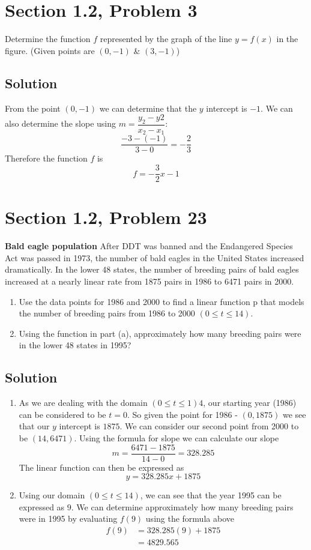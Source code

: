 \documentclass{article}
\newcommand{\problem}[2]{\vspace{5ex}\section*{Section #1, Problem #2}}
\newcommand{\solution}{\subsection*{Solution}}
\begin{document}
\problem{1.2}{3}
Determine the function $f$ represented by the graph of the line $y = f(x)$ in the figure.
(Given points are $(0, -1)$ \& $(3, -1)$)

\solution{}
From the point $(0, -1)$ we can determine that the $y$ intercept is $-1$. We can also determine the
slope using $m = \dfrac{y_2 - y2}{x_2 - x_1}$:
\[
  \frac{-3 - (-1)}{3 - 0} = -\frac{2}{3}
\]
Therefore the function $f$ is
\[
  f = -\frac{3}{2}x - 1
\]

\problem{1.2}{23}
\textbf{Bald eagle population} After DDT was banned and the Endangered Species Act was passed in
1973, the number of bald eagles in the United States increased dramatically. In the lower 48 states,
the number of breeding pairs of bald eagles increased at a nearly linear rate from 1875 pairs in
1986 to 6471 pairs in 2000.

\begin{enumerate}[label=\textbf{\alph*. }]
  \item Use the data points for 1986 and 2000 to find a linear function p that models the number of
    breeding pairs from 1986 to 2000 $(0 \leq t \leq 14)$.
  \item Using the function in part (a), approximately how many breeding pairs were in the lower 48
    states in 1995?
\end{enumerate}

\solution{}
\begin{enumerate}[label=\textbf{\alph*. }]
\item
  As we are dealing with the domain $(0 \leq t \leq 1)4$, our starting year (1986) can be considered
  to be $t = 0$. So given the point for 1986 \-- $(0, 1875)$ we see that our $y$ intercept is
  $1875$. We can consider our second point from 2000 to be $(14, 6471)$. Using the formula for slope
  we can calculate our slope
  \[
    m = \frac{6471 - 1875}{14 - 0} = 328.285
  \]
  The linear function can then be expressed as
  \[
    y = 328.285x + 1875
  \]

\item
  Using our domain $(0 \leq t \leq 14)$, we can see that the year 1995 can be expressed as $9$.
  We can determine approximately how many breeding pairs were in 1995 by evaluating $f(9)$ using the
  formula above
  \begin{align*}
    f(9) &= 328.285(9) + 1875 \\
         &= 4829.565
  \end{align*}
\end{enumerate}
\end{document}
